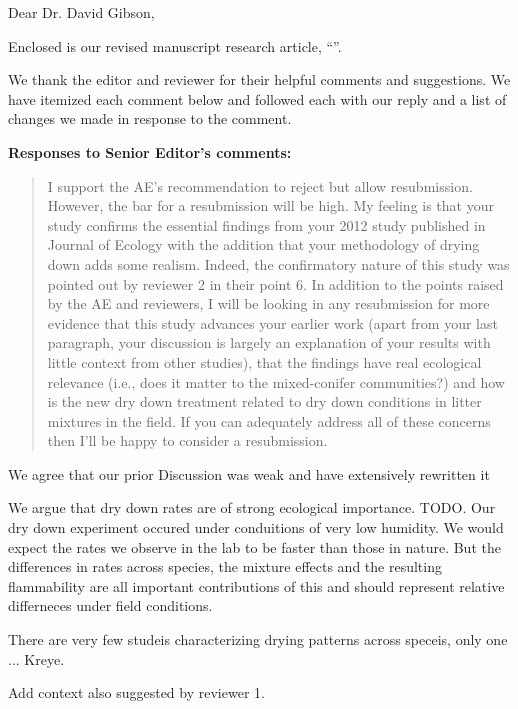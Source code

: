 \documentclass[letterpaper, 12pt]{letter}
\begin{document}
\begin{letter}{}

\opening{Dear Dr. David Gibson,}

Enclosed is our revised manuscript research article, ``''.

We thank the editor and reviewer for their helpful comments and suggestions. We
have itemized each comment below and followed each with our reply and a list of
changes we made in response to the comment. 


{\bf Responses to Senior Editor's comments:}

\begin{quote}
 I support the AE's recommendation to reject but allow resubmission. However, the bar for a resubmission will be high. My feeling is that your study confirms the essential findings from your 2012 study published in Journal of Ecology with the addition that your methodology of drying down adds some realism. Indeed, the confirmatory nature of this study was pointed out by reviewer 2 in their point 6. In addition to the points raised by the AE and reviewers, I will be looking in any resubmission for more evidence that this study advances your earlier work (apart from your last paragraph, your discussion is largely an explanation of your results with little context from other studies), that the findings have real ecological relevance (i.e., does it matter to the mixed-conifer communities?) and how is the new dry down treatment related to dry down conditions in litter mixtures in the field. If you can adequately address all of these concerns then I'll be happy to consider a resubmission.
\end{quote}

We agree that our prior Discussion was weak and have extensively rewritten it


We argue that dry down rates are of strong ecological importance.
TODO.  Our dry down experiment occured under conduitions of very low humidity. We would expect the rates we observe in the lab to be faster than those in nature. But the differences in rates across species, the mixture effects and the resulting flammability are all important contributions of this and should represent relative differneces under field conditions.

There are very few studeis characterizing drying patterns across speceis, only one ... Kreye.

Add context also suggested by reviewer 1.

\begin{quote}
 

\end{quote}
\end{letter}
\end{document}
